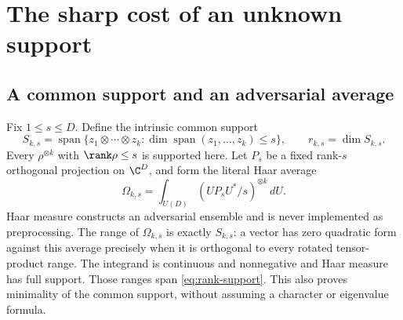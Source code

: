 \section{The sharp cost of an unknown support}\label{sec:support}

\subsection{A common support and an adversarial average}
Fix $1\le s\le D$. Define the intrinsic common support
\begin{equation}\label{eq:rank-support}
 S_{k,s}=\operatorname{span}\{z_1\otimes\cdots\otimes z_k:
 \dim\operatorname{span}(z_1,\ldots,z_k)\le s\},\qquad r_{k,s}=\dim S_{k,s}.
\end{equation}
Every $\rho^{\otimes k}$ with $\rank\rho\le s$ is supported here. Let $P_s$ be a fixed rank-$s$ orthogonal projection on $\C^D$, and form the literal Haar average
\begin{equation}\label{eq:haar-average}
 \Omega_{k,s}=\int_{U(D)}(UP_sU^*/s)^{\otimes k}\,dU.
\end{equation}
Haar measure constructs an adversarial ensemble and is never implemented as preprocessing. The range of $\Omega_{k,s}$ is exactly $S_{k,s}$: a vector has zero quadratic form against this average precisely when it is orthogonal to every rotated tensor-product range. The integrand is continuous and nonnegative and Haar measure has full support. Those ranges span \eqref{eq:rank-support}. This also proves minimality of the common support, without assuming a character or eigenvalue formula.

